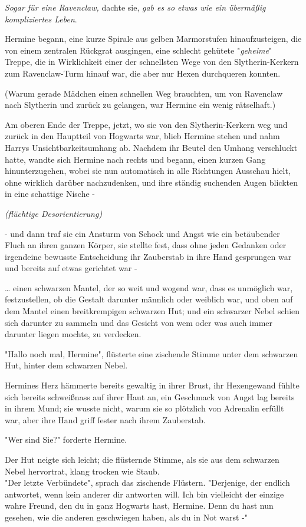{\emph{Sogar für eine Ravenclaw,} dachte sie, \emph{gab es so etwas wie ein übermäßig kompliziertes Leben}.

Hermine begann, eine kurze Spirale aus gelben Marmorstufen hinaufzusteigen, die von einem zentralen Rückgrat ausgingen, eine schlecht gehütete "\emph{geheime}" Treppe, die in Wirklichkeit einer der schnellsten Wege von den Slytherin-Kerkern zum Ravenclaw-Turm hinauf war, die aber nur Hexen durchqueren konnten.

(Warum gerade Mädchen einen schnellen Weg brauchten, um von Ravenclaw nach Slytherin und zurück zu gelangen, war Hermine ein wenig rätselhaft.)

Am oberen Ende der Treppe, jetzt, wo sie von den Slytherin-Kerkern weg und zurück in den Hauptteil von Hogwarts war, blieb Hermine stehen und nahm Harrys Unsichtbarkeitsumhang ab. Nachdem ihr Beutel den Umhang verschluckt hatte, wandte sich Hermine nach rechts und begann, einen kurzen Gang hinunterzugehen, wobei sie nun automatisch in alle Richtungen Ausschau hielt, ohne wirklich darüber nachzudenken, und ihre ständig suchenden Augen blickten in eine schattige Nische -

\emph{(flüchtige Desorientierung)}

- und dann traf sie ein Ansturm von Schock und Angst wie ein betäubender Fluch an ihren ganzen Körper, sie stellte fest, dass ohne jeden Gedanken oder irgendeine bewusste Entscheidung ihr Zauberstab in ihre Hand gesprungen war und bereits auf etwas gerichtet war -

… einen schwarzen Mantel, der so weit und wogend war, dass es unmöglich war, festzustellen, ob die Gestalt darunter männlich oder weiblich war, und oben auf dem Mantel einen breitkrempigen schwarzen Hut; und ein schwarzer Nebel schien sich darunter zu sammeln und das Gesicht von wem oder was auch immer darunter liegen mochte, zu verdecken.

"Hallo noch mal, Hermine", flüsterte eine zischende Stimme unter dem schwarzen Hut, hinter dem schwarzen Nebel.

Hermines Herz hämmerte bereits gewaltig in ihrer Brust, ihr Hexengewand fühlte sich bereits schweißnass auf ihrer Haut an, ein Geschmack von Angst lag bereits in ihrem Mund; sie wusste nicht, warum sie so plötzlich von Adrenalin erfüllt war, aber ihre Hand griff fester nach ihrem Zauberstab.

"Wer sind Sie?" forderte Hermine.

Der Hut neigte sich leicht; die flüsternde Stimme, als sie aus dem schwarzen Nebel hervortrat, klang trocken wie Staub.\\ "Der letzte Verbündete", sprach das zischende Flüstern. "Derjenige, der endlich antwortet, wenn kein anderer dir antworten will. Ich bin vielleicht der einzige wahre Freund, den du in ganz Hogwarts hast, Hermine. Denn du hast nun gesehen, wie die anderen geschwiegen haben, als du in Not warst -"

}
